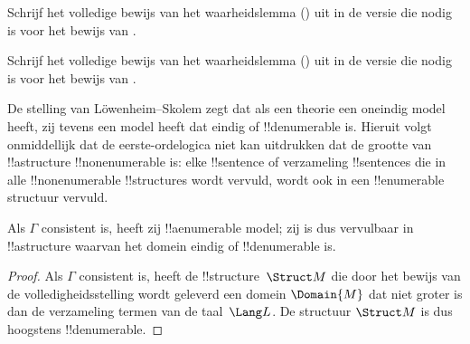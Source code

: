 \documentclass[openany]{memoir}
\begin{document}
\begin{prob}
Schrijf het volledige bewijs van het waarheidslemma
() uit in de versie die nodig is voor
het bewijs van .
\end{prob}
\tagendprob

\begin{prob}
Schrijf het volledige bewijs van het waarheidslemma
() uit in de versie die nodig is voor
het bewijs van .
\end{prob}
\tagendprob
\endgroup

\begingroup
\def\olfilename{OLP-0137}
\def\olfilepath{content/first-order-logic/completeness/}
\hypertarget{unit-OLP-0137}{}




De stelling van L\"owenheim--Skolem zegt dat als een theorie een oneindig
model heeft, zij tevens een model heeft dat eindig of !!{denumerable} is.
Hieruit volgt onmiddellijk dat de eerste-ordelogica niet kan uitdrukken
dat de grootte van !!a{structure} !!{nonenumerable} is: elke !!{sentence}
of verzameling !!{sentence}s die in alle !!{nonenumerable} !!{structure}s
wordt vervuld, wordt ook in een !!{enumerable} structuur vervuld.

\begin{thm} 
 Als $\Gamma$ consistent is, heeft zij
!!a{enumerable} model; zij is dus vervulbaar in !!a{structure}
waarvan het domein eindig of !!{denumerable} is.
\end{thm}

\begin{proof}
Als $\Gamma$ consistent is, heeft de !!{structure}~$\Struct M$ die door
het bewijs van de volledigheidsstelling wordt geleverd een domein
$\Domain{M}$ dat niet groter is dan de verzameling termen van de
taal~$\Lang L$. De structuur $\Struct M$ is dus hoogstens
!!{denumerable}.
\end{proof}
\end{document}
